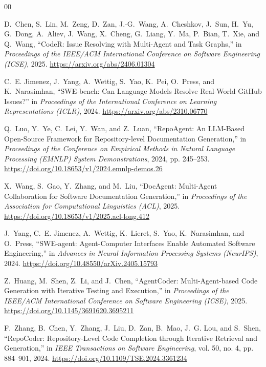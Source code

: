 \documentclass[conference]{IEEEtran}
\begin{document}
\begin{thebibliography}{00}
\scriptsize
\setlength{\itemsep}{0pt}
\setlength{\parskip}{0pt}

D.~Chen, S.~Lin, M.~Zeng, D.~Zan, J.-G.~Wang, A.~Cheshkov, J.~Sun, H.~Yu, G.~Dong, A.~Aliev, J.~Wang, X.~Cheng, G.~Liang, Y.~Ma, P.~Bian, T.~Xie, and Q.~Wang, ``CodeR: Issue Resolving with Multi-Agent and Task Graphs,'' in \emph{Proceedings of the IEEE/ACM International Conference on Software Engineering (ICSE)}, 2025. \url{https://arxiv.org/abs/2406.01304}

C.~E. Jimenez, J.~Yang, A.~Wettig, S.~Yao, K.~Pei, O.~Press, and K.~Narasimhan, ``SWE-bench: Can Language Models Resolve Real-World GitHub Issues?'' in \emph{Proceedings of the International Conference on Learning Representations (ICLR)}, 2024. \url{https://arxiv.org/abs/2310.06770}

Q.~Luo, Y.~Ye, C.~Lei, Y.~Wan, and Z.~Luan, ``RepoAgent: An LLM-Based Open-Source Framework for Repository-level Documentation Generation,'' in \emph{Proceedings of the Conference on Empirical Methods in Natural Language Processing (EMNLP) System Demonstrations}, 2024, pp. 245--253. \url{https://doi.org/10.18653/v1/2024.emnlp-demos.26}

X.~Wang, S.~Gao, Y.~Zhang, and M.~Liu, ``DocAgent: Multi-Agent Collaboration for Software Documentation Generation,'' in \emph{Proceedings of the Association for Computational Linguistics (ACL)}, 2025. \url{https://doi.org/10.18653/v1/2025.acl-long.412}

J.~Yang, C.~E. Jimenez, A.~Wettig, K.~Lieret, S.~Yao, K.~Narasimhan, and O.~Press, ``SWE-agent: Agent-Computer Interfaces Enable Automated Software Engineering,'' in \emph{Advances in Neural Information Processing Systems (NeurIPS)}, 2024. \url{https://doi.org/10.48550/arXiv.2405.15793}

Z.~Huang, M.~Shen, Z.~Li, and J.~Chen, ``AgentCoder: Multi-Agent-based Code Generation with Iterative Testing and Execution,'' in \emph{Proceedings of the IEEE/ACM International Conference on Software Engineering (ICSE)}, 2025. \url{https://doi.org/10.1145/3691620.3695211}

F.~Zhang, B.~Chen, Y.~Zhang, J.~Liu, D.~Zan, B.~Mao, J.~G. Lou, and S.~Shen, ``RepoCoder: Repository-Level Code Completion through Iterative Retrieval and Generation,'' in \emph{IEEE Transactions on Software Engineering}, vol. 50, no. 4, pp. 884--901, 2024. \url{https://doi.org/10.1109/TSE.2024.3361234}


\end{thebibliography}
\end{document}
